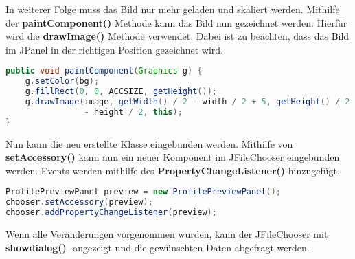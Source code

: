 In weiterer Folge muss das Bild nur mehr geladen und skaliert werden. Mithilfe der \textbf{paintComponent()} Methode kann das Bild nun gezeichnet werden. Hierfür wird die \textbf{drawImage()} Methode verwendet. Dabei ist zu beachten, dass das Bild im JPanel in der richtigen Position gezeichnet wird.
\begin{lstlisting}[language=JAVA]
public void paintComponent(Graphics g) {
	g.setColor(bg);
	g.fillRect(0, 0, ACCSIZE, getHeight());
	g.drawImage(image, getWidth() / 2 - width / 2 + 5, getHeight() / 2
				- height / 2, this);
}
\end{lstlisting}

Nun kann die neu erstellte Klasse eingebunden werden. Mithilfe von \textbf{setAccessory()} kann nun ein neuer Komponent im JFileChooser eingebunden werden. Events werden mithilfe des \textbf{PropertyChangeListener()} hinzugefügt.

\begin{lstlisting}[language=JAVA]
ProfilePreviewPanel preview = new ProfilePreviewPanel();
chooser.setAccessory(preview);
chooser.addPropertyChangeListener(preview);
\end{lstlisting}

Wenn alle Veränderungen vorgenommen wurden, kann der JFileChooser mit \textbf{showdialog()}- angezeigt und die gewünschten Daten abgefragt werden.